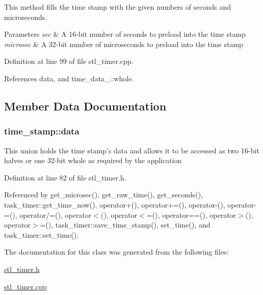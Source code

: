 This method fills the time stamp with the given numbers of seconds and microseconds. 
\begin{DoxyParams}{Parameters}
{\em sec} & A 16-\/bit number of seconds to preload into the time stamp \\
\hline
{\em microsec} & A 32-\/bit number of microseconds to preload into the time stamp \\
\hline
\end{DoxyParams}


Definition at line 99 of file stl\-\_\-timer.\-cpp.



References data, and time\-\_\-data\-\_\-::whole.



\subsection{Member Data Documentation}
\hypertarget{classtime__stamp_a6a0f1a055f94329150a65aa32a02c1ac}{
\subsubsection[{data}]{ time\-\_\-stamp\-::data\hspace{0.3cm}{\ttfamily [protected]}}}\label{classtime__stamp_a6a0f1a055f94329150a65aa32a02c1ac}
This union holds the time stamp's data and allows it to be accessed as two 16-\/bit halves or one 32-\/bit whole as required by the application 

Definition at line 82 of file stl\-\_\-timer.\-h.



Referenced by get\-\_\-microsec(), get\-\_\-raw\-\_\-time(), get\-\_\-seconds(), task\-\_\-timer\-::get\-\_\-time\-\_\-now(), operator+(), operator+=(), operator-\/(), operator-\/=(), operator/=(), operator$<$(), operator$<$=(), operator==(), operator$>$(), operator$>$=(), task\-\_\-timer\-::save\-\_\-time\-\_\-stamp(), set\-\_\-time(), and task\-\_\-timer\-::set\-\_\-time().



The documentation for this class was generated from the following files\-:\begin{DoxyCompactItemize}
\item 
\hyperlink{stl__timer_8h}{stl\-\_\-timer.\-h}\item 
\hyperlink{stl__timer_8cpp}{stl\-\_\-timer.\-cpp}\end{DoxyCompactItemize}
